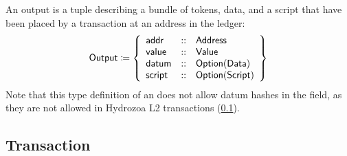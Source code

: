 \documentclass[../hydrozoa.tex]{subfiles}
\begin{document}
An output is a tuple describing a bundle of tokens, data, and a script that have been placed by a transaction at an address in the ledger:
\begin{equation*}
    \mathsf{Output} \coloneq \left\{
    \begin{array}{lll}
      \mathsf{addr} &::& \mathsf{Address} \\
        \mathsf{value} &::& \mathsf{Value} \\
        \mathsf{datum} &::& \mathsf{Option(Data)} \\
        \mathsf{script} &::& \mathsf{Option(Script)}
    \end{array} \right\}
\end{equation*}
Note that this type definition of an  does not allow datum hashes in the  field, as they are not allowed in Hydrozoa L2 transactions (\cref{h:ledger-transaction}).

\subsection{Transaction}%
\label{h:ledger-transaction}
\end{document}
